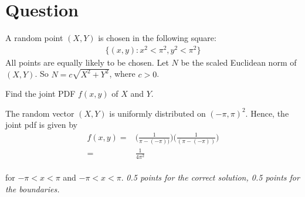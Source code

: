 \section*{Question}

A random point $(X,Y)$ is chosen in the following square:
\begin{align*}
    \{(x, y) : x^2 < \pi^2,  y^2 < \pi^2 \}
\end{align*}
All points are equally likely to be chosen. Let $N$ be the scaled Euclidean norm of $(X,Y)$. So $N = c\sqrt{X^2 + Y^2}$, where $c > 0$.
\begin{exercise}[1]
Find the joint PDF $f(x,y)$ of $X$ and $Y$.
\begin{solution}
The random vector $(X,Y)$ is uniformly distributed on $(-\pi, \pi)^2$. Hence, the joint pdf is given by
\begin{align*}
    f(x,y) =& \Big(\frac{1}{\pi - (-\pi))} \Big) \Big(\frac{1}{(\pi - (-\pi))} \Big) \\
    =& \frac{1}{4 \pi^2}
\end{align*}\\
for $-\pi < x < \pi$ and $-\pi < x < \pi$.
\textit{0.5 points for the correct solution, 0.5 points for the boundaries.}
\end{solution}
\end{exercise}

